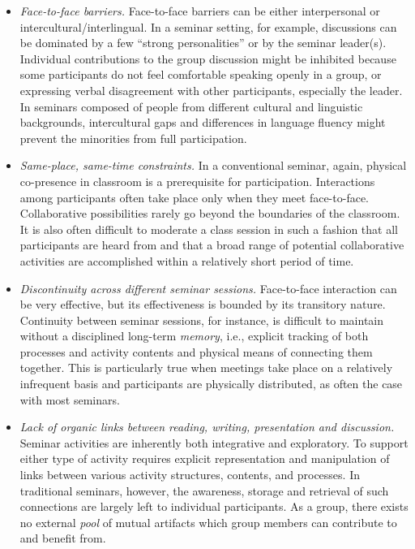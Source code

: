 \begin{itemize}
\item {\it Face-to-face barriers.} Face-to-face barriers can be either
  interpersonal or intercultural/interlingual. In a seminar setting, for
  example, discussions can be dominated by a few ``strong personalities''
  or by the seminar leader(s). Individual contributions to the group
  discussion might be inhibited because some participants do not feel
  comfortable speaking openly in a group, or expressing verbal disagreement
  with other participants, especially the leader. In seminars composed of
  people from different cultural and linguistic backgrounds, intercultural
  gaps and differences in language fluency might prevent the minorities
  from full participation.
  
\item {\it Same-place, same-time constraints.} In a conventional seminar,
  again, physical co-presence in classroom is a prerequisite for
  participation.  Interactions among participants often take place only
  when they meet face-to-face. Collaborative possibilities rarely go beyond
  the boundaries of the classroom. It is also often difficult to moderate a
  class session in such a fashion that all participants are heard from and
  that a broad range of potential collaborative activities are accomplished
  within a relatively short period of time.
  
\item {\it Discontinuity across different seminar sessions.} Face-to-face
  interaction can be very effective, but its effectiveness is bounded by
  its transitory nature. Continuity between seminar sessions, for instance,
  is difficult to maintain without a disciplined long-term {\it memory\/},
  i.e., explicit tracking of both processes and activity contents and
  physical means of connecting them together. This is particularly true
  when meetings take place on a relatively infrequent basis and
  participants are physically distributed, as often the case with most
  seminars.
  
\item {\it Lack of organic links between reading, writing, presentation
  and discussion.} Seminar activities are inherently both integrative and
  exploratory. To support either type of activity requires explicit
  representation and manipulation of links between various activity
  structures, contents, and processes. In traditional seminars, however,
  the awareness, storage and retrieval of such connections are largely left
  to individual participants.  As a group, there exists no external {\it
  pool\/} of mutual artifacts which group members can contribute to and
  benefit from.
\end{itemize}

